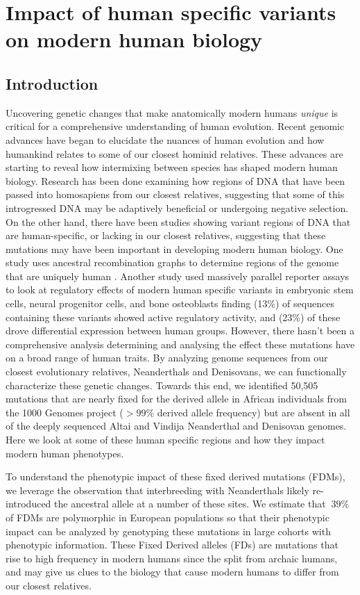 \chapter{Impact of human specific variants on modern human biology}
\section{Introduction}
Uncovering genetic changes that make anatomically modern humans {\em unique} is critical for a comprehensive understanding of human evolution. Recent genomic advances have began to elucidate the nuances of human evolution and how humankind relates to some of our closest hominid relatives. These advances are starting to reveal how intermixing between species has shaped modern human biology. Research has been done examining how regions of DNA that have been passed into homosapiens from our closest relatives, suggesting that some of this introgressed DNA may be adaptively beneficial or undergoing negative selection. On the other hand, there have been studies showing variant regions of DNA that are human-specific, or lacking in our closest relatives, suggesting that these mutations may have been important in developing modern human biology. 
One study uses ancestral recombination graphs to determine regions of the genome that are uniquely human \cite{schaefer2021ancestral}. 
Another study used massively parallel reporter assays to look at regulatory effects of modern human specific variants \cite{weiss2021cis} in embryonic stem cells, neural progenitor cells, and bone osteoblasts finding (13\%) of sequences containing these variants showed active regulatory activity, and (23\%) of these drove differential expression between human groups. However, there hasn't been a comprehensive analysis determining and analysing the effect these mutations have on a broad range of human traits.
By analyzing genome sequences from our closest evolutionary relatives, Neanderthals and Denisovans, we can functionally characterize these genetic changes. Towards this end, we identified 50,505 mutations that are nearly fixed for the derived allele in African individuals from the 1000 Genomes project ($>99\%$ derived allele frequency) but are absent in all of the deeply sequenced Altai and Vindija Neanderthal and Denisovan genomes. Here we look at some of these human specific regions and how they impact modern human phenotypes.

To understand the phenotypic impact of these fixed derived mutations (FDMs), we leverage the observation that interbreeding with Neanderthals likely re-introduced the ancestral allele at a number of these sites. We estimate that $~39\%$ of FDMs are polymorphic in European populations so that their phenotypic impact can be analyzed by genotyping these mutations in large cohorts with phenotypic information. These Fixed Derived alleles (FDs) are mutations that rise to high frequency  in  modern  humans  since  the  split  from  archaic humans, and may give us clues to the biology that cause modern humans to differ from our closest relatives.
